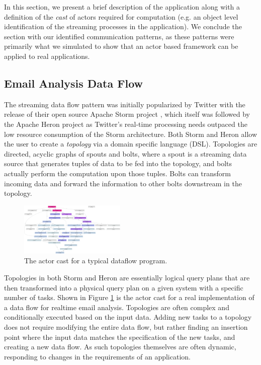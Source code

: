 \documentclass[conference,twocolumn,10pt]{IEEEtran}
\begin{document}
In this section, we present a brief description of the application along with a definition of the \textit{cast} of actors required for computation (e.g. an object level identification of the streaming processes in the application). We conclude the section with our identified communication patterns, as these patterns were primarily what we simulated to show that an actor based framework can be applied to real applications.

\subsection{Email Analysis Data Flow}

The streaming data flow pattern was initially popularized by Twitter with the release of their open source Apache Storm project \cite{toshniwal_storm_2014}, which itself was followed by the Apache Heron project \cite{kulkarni_twitter_2015} as Twitter's real-time processing needs outpaced the low resource consumption of the Storm architecture. Both Storm and Heron allow the user to create a \textit{topology} via a domain specific language (DSL). Topologies are directed, acyclic graphs of spouts and bolts, where a spout is a streaming data source that generates tuples of data to be fed into the topology, and bolts actually perform the computation upon those tuples. Bolts can transform incoming data and forward the information to other bolts downstream in the topology.

\begin{figure}[!h]
    \centering
    \includegraphics[width=0.45\textwidth]{dataflow_cast}
    \caption{The actor cast for a typical dataflow program.}
    \label{fig:dataflow_cast}
\end{figure}

Topologies in both Storm and Heron are essentially logical query plans that are then transformed into a physical query plan on a given system with a specific number of tasks. Shown in Figure \ref{fig:dataflow_cast} is the actor cast for a real implementation of a data flow for realtime email analysis. Topologies are often complex and conditionally executed based on the input data. Adding new tasks to a topology does not require modifying the entire data flow, but rather finding an insertion point where the input data matches the specification of the new tasks, and creating a new data flow. As such topologies themselves are often dynamic, responding to changes in the requirements of an application.
\end{document}
